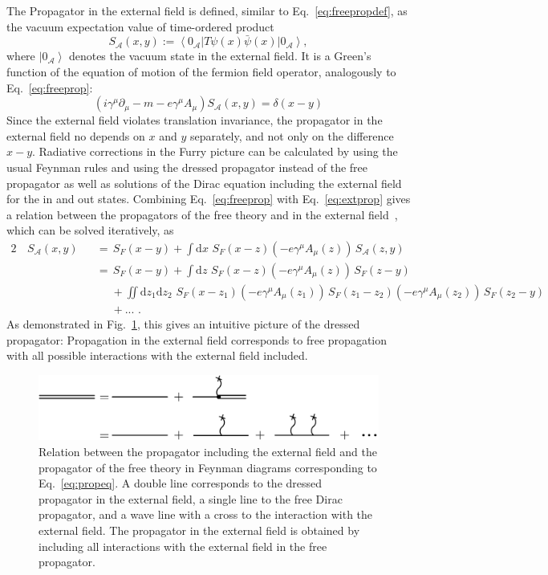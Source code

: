 The Propagator in the external field is defined, similar to Eq.~\eqref{eq:freepropdef}, as the vacuum expectation value of time-ordered product
\begin{equation}
S_{\mathcal{A}}(x,y):=\left<0_\mathcal{A}\right|T\psi(x)\bar{\psi}(x) \left|0_\mathcal{A}\right>,
\label{eq:extpropdef}
\end{equation}
where $\left|0_\mathcal{A}\right>$ denotes the vacuum state in the external field.
It is a Green's function of the equation of motion of the fermion field operator, analogously to Eq.~\eqref{eq:freeprop}:
\begin{equation}
\left(i\gamma^\mu \partial_\mu -m - e \gamma^\mu A_\mu\right)S_{\mathcal{A}}(x,y)=\delta(x-y)
\label{eq:extprop}
\end{equation}
Since the external field violates translation invariance, the propagator in the external field no depends on $x$ and $y$ separately, and not only on the difference $x-y$. Radiative corrections in the Furry picture can be calculated by using the usual Feynman rules and using the dressed propagator instead of the free propagator as well as solutions of the Dirac equation including the external field for the in and out states. Combining Eq.~\eqref{eq:freeprop} with Eq.~\eqref{eq:extprop} gives a relation between the propagators of the free theory and in the external field~\mbox{\cite[Section 2.5.]{itzykson2005}}, which can be solved iteratively, as
\begin{alignat}{2}
&\,S_{\mathcal{A}}(x,y)&&= \,S_F(x-y) 
+ \int\mathrm{d}x\, \,S_F(x-z)\left(-e\gamma^\mu A_\mu(z)\right)\,S_{\mathcal{A}}(z,y)\\
& &&=\,S_F(x-y)+\int\mathrm{d}z\,\,S_F(x-z)(-e\gamma^\mu A_\mu(z))\,S_F(z-y)\\
&&&\phantom{=}+\iint\mathrm{d}z_1\mathrm{d}z_2\,\,S_F(x-z_1)(-e\gamma^\mu A_\mu(z_1))\,S_F(z_1-z_2)(-e\gamma^\mu A_\mu(z_2))\,S_F(z_2-y)\\
&&&\phantom{=}+...\,\,.\label{eq:propeq}
\end{alignat}
As demonstrated in Fig.~\ref{fig:propagator}, this gives an intuitive picture of the dressed propagator: Propagation in the external field corresponds to free propagation with all possible interactions with the external field included.
%
\begin{figure}%
\centering
\includegraphics[width=0.9\linewidth]{pics/propagator.pdf}%
\caption{Relation between the propagator including the external field and the propagator of the free theory in Feynman diagrams corresponding to Eq.~\eqref{eq:propeq}. A double line corresponds to the dressed propagator in the external field, a single line to the free Dirac propagator, and a wave line with a cross to the interaction with the external field. The propagator in the external field is obtained by including all interactions with the external field in the free propagator.}%
\label{fig:propagator}%
\end{figure}
